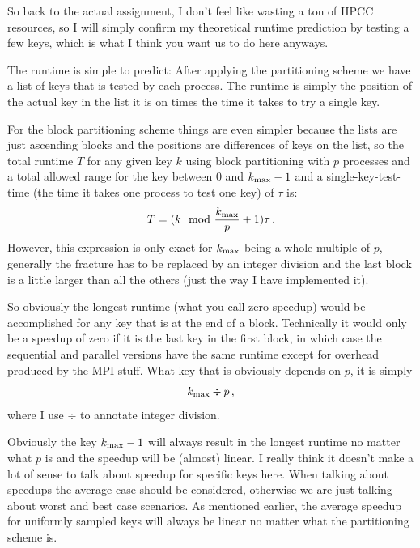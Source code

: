 \documentclass[a4paper, 11pt]{article}
\begin{document}
So back to the actual assignment, I don't feel like wasting a ton of HPCC
resources, so I will simply confirm my theoretical runtime prediction by
testing a few keys, which is what I think you want us to do here anyways.

The runtime is simple to predict: After applying the partitioning scheme we
have a list of keys that is tested by each process. The runtime is simply
the position of the actual key in the list it is on times the time it takes to
try a single key.

For the block partitioning scheme things are even simpler because the lists are
just ascending blocks and the positions are differences of keys on the list, so
the total runtime $T$ for any given key $k$ using block partitioning with $p$
processes and a total allowed range for the key between $0$ and
$k_{\textup{max}} - 1$ and a single-key-test-time (the time it takes one process to
test one key) of $\tau$ is:
\begin{equation}
  T = (k\mod\frac{k_{\textup{max}}}{p} + 1)\tau\,.
  \label{eqn:block_prediciton}
\end{equation}
However, this expression is only exact for $k_\textup{max}$ being a whole
multiple of $p$, generally the fracture has to be replaced by an integer
division and the last block is a little larger than all the others (just the
way I have implemented it).

So obviously the longest runtime (what you call zero speedup) would be
accomplished for any key that is at the end of a block. Technically it would
only be a speedup of zero if it is the last key in the first block, in which
case the sequential and parallel versions have the same runtime except for
overhead produced by the MPI stuff. What key that is obviously depends on $p$,
it is simply
\begin{equation}
  k_{\textup{max}}\div p\,,
\end{equation}
where I use $\div$ to annotate integer division. 

Obviously the key $k_{\textup{max}} - 1$ will always result in the longest
runtime no matter what $p$ is and the speedup will be (almost) linear. I really
think it doesn't make a lot of sense to talk about speedup for specific keys
here. When talking about speedups the average case should be considered,
otherwise we are just talking about worst and best case scenarios. As mentioned
earlier, the average speedup for uniformly sampled keys will always be linear
no matter what the partitioning scheme is.
\end{document}
